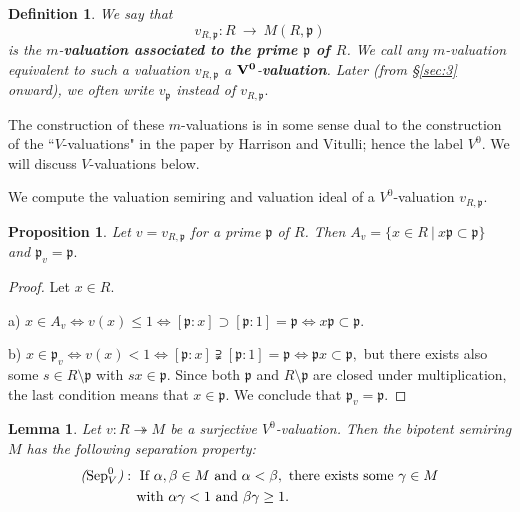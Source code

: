 \documentclass [12pt,a4paper,reqno]{amsart}
\newtheorem{lem}[thm]{Lemma}
\newtheorem{prop}[thm]{Proposition}
\newtheorem{defn}[thm]{Definition}
\begin{document}
\begin{defn}\label{defn1.7}
We say that $$v_{R,{\mathfrak p}}: R {\ {\to} \ } M(R,{\mathfrak p})$$ is the
$m$-{\textbf{{valuation associated to the  prime ${\mathfrak p}$ of $R$}}}. We
call any $m$-valuation equivalent to such a valuation $v_{R,{\mathfrak p}}$
a ${\bf {V^0}}$-{\textbf{{valuation}}}. Later (from \S\ref{sec:3} onward),
we often write $v_{\mathfrak p}$ instead of $v_{R,{\mathfrak p}}.$
\end{defn}

The construction of these $m$-valuations is in some sense dual to
the construction of the ``$V$-valuations" in the paper \cite{HV1}
by Harrison and Vitulli; hence the label ${V^0}$. We will discuss
$V$-valuations below.

We compute the valuation semiring and valuation ideal of a
${V^0}$-valuation $v_{R,{\mathfrak p}}.$

\begin{prop}\label{prop1.8}
Let $v=v_{R,{\mathfrak p}}$ for a prime ${\mathfrak p}$ of $R$. Then $A_v=\{x\in R
{\ {|} \ } x {\mathfrak p} \subset {\mathfrak p} \}$ and ${\mathfrak p} _v={\mathfrak p} .$
\end{prop}

\begin{proof}
Let $x\in R.$

\noindent a) $x\in A_v\Leftrightarrow v(x)\le 1\Leftrightarrow
[{\mathfrak p}:x]\supset[{\mathfrak p} :1]={\mathfrak p} \Leftrightarrow x{\mathfrak p} \subset {\mathfrak p}.$
{\vskip 1.5mm \noindent}

\noindent b) $x\in {\mathfrak p} _v\Leftrightarrow v(x)< 1\Leftrightarrow
[{\mathfrak p}:x] \supsetneqq[{\mathfrak p} :1]={\mathfrak p} \Leftrightarrow {\mathfrak p} x\subset
{\mathfrak p} ,$ but there exists also some $s\in R\setminus {\mathfrak p} $ with
$sx\in {\mathfrak p} .$ Since both ${\mathfrak p}$ and $R\setminus {\mathfrak p} $ are closed
under multiplication, the last  condition means that $x\in {\mathfrak p}.$
We conclude that ${\mathfrak p}_v = {\mathfrak p}$.
\end{proof}

\begin{lem}\label{lem1.9}
Let $v: R\twoheadrightarrow  M$ be a surjective ${V^0}$-valuation.
Then the bipotent semiring $M$ has the following separation
property:
 \begin{align*}& \text{\emph{(${\operatorname{Sep}}^0_V$)}}: \ \text{If}\ {\alpha} ,{\beta} \in M \ \text{and}\
 {\alpha} <{\beta} ,\ \text{there exists some} \  {\gamma} \in
 M\\   & \qquad \qquad \text{with}\  {\alpha} {\gamma} <1\ \text{and}\
{\beta} {\gamma} \ge 1.
\end{align*}

\end{lem}
\end{document}
